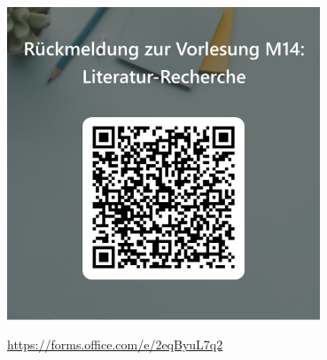 \documentclass{beamer}
\begin{document}
\begin{frame}

\begin{center}
    \includegraphics[width=0.7\textwidth]{feedback_QR.png}
\end{center}


\url{https://forms.office.com/e/2eqByuL7q2}

\end{frame}
\end{document}
